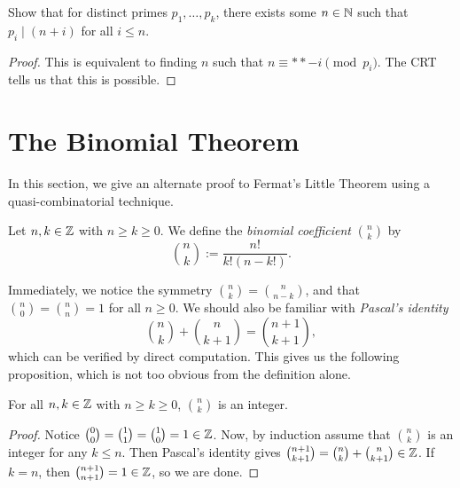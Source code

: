 \documentclass{article}
\begin{document}
\begin{example}
Show that for distinct primes $p_1, \ldots, p_k$, there exists some $n\in\mathbb N$ such that $p_i \mid (n+i)$ for all $i\leq n$.
\end{example}
\begin{proof}
This is equivalent to finding $n$ such that $n\equiv** -i \pmod{p_i}$. The CRT tells us that this is possible.
\end{proof}

\setcounter{section}{66}
\section{The Binomial Theorem}
In this section, we give an alternate proof to Fermat's Little Theorem using a quasi-combinatorial technique.
\begin{definition}
Let $n,k\in\mathbb Z$ with $n\geq k\geq 0$. We define the \textit{binomial coefficient} $\binom nk$ by
$$\binom nk := \frac{n!}{k!(n-k!)}.$$
\end{definition}
Immediately, we notice the symmetry $\binom nk = \binom n{n-k}$, and that $\binom n0 = \binom nn = 1$ for all $n\geq 0$. We should also be familiar with \textit{Pascal's identity}
\begin{equation}\label{pascal}
\binom nk + \binom n{k+1} = \binom{n+1}{k+1},
\end{equation}
which can be verified by direct computation. This gives us the following proposition, which is not too obvious from the definition alone.

\begin{proposition}
For all $n,k\in\mathbb Z$ with $n\geq k\geq 0$, $\binom nk$ is an integer.
\end{proposition}
\begin{proof}
Notice $\binom 00 = \binom 11 = \binom 10 = 1\in \mathbb Z$. Now, by induction assume that $\binom nk$ is an integer for any $k\leq n$. Then Pascal's identity gives $\binom{n+1}{k+1} = \binom nk + \binom n{k+1}\in\mathbb Z$. If $k=n$, then $\binom{n+1}{n+1} = 1\in \mathbb Z$, so we are done.
\end{proof}
\end{document}
